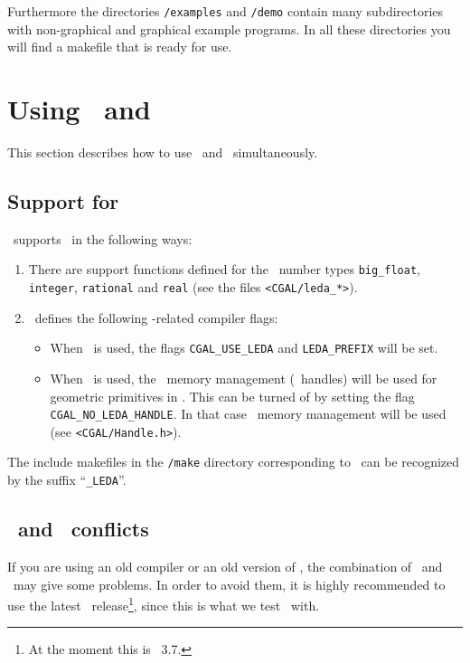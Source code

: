 Furthermore the directories \texttt{\cgaldir/examples} and
\texttt{\cgaldir/demo} contain many subdirectories with non-graphical
and graphical example programs.  In all these directories you will
find a makefile that is ready for use.

\section{Using \cgal\ and \leda}\label{sec:leda}
This section describes how to use \cgal\ and \leda\ simultaneously.

\subsection{Support for \leda}
\cgal\ supports \leda\ in the following ways:

\begin{enumerate}
\item There are support functions defined for the \leda\ number types
  \texttt{big\_float}, \texttt{integer}, \texttt{rational} and
  \texttt{real} (see the files \texttt{<CGAL/leda\_*>}).

\item
\cgal\ defines the following \leda-related compiler flags:
\begin{itemize}
\item When \leda\ is used, the flags \texttt{CGAL\_USE\_LEDA} and
  \texttt{LEDA\_PREFIX} will be set.
\item When \leda\ is used, the \leda\ memory management (\leda\ handles) will be
used for geometric primitives in \cgal. This can be turned of by setting the flag
\texttt{CGAL\_NO\_LEDA\_HANDLE}. In that case \cgal\ memory management will
be used (see \texttt{<CGAL/Handle.h>}).
\end{itemize}
\end{enumerate}

The include makefiles in the \texttt{\cgaldir/make} directory
corresponding to \leda\ can be recognized by the suffix
``\texttt{\_LEDA}''.

\subsection{\leda\ and \stl\ conflicts}

If you are using an old compiler or an old version of \stl, the
combination of \leda\ and \stl\ may give some problems. In order to
avoid them, it is highly recommended to use the latest \leda\ 
release\footnote{At the moment this is \leda\ 3.7.}, since this is
what we test \cgal\ with.

